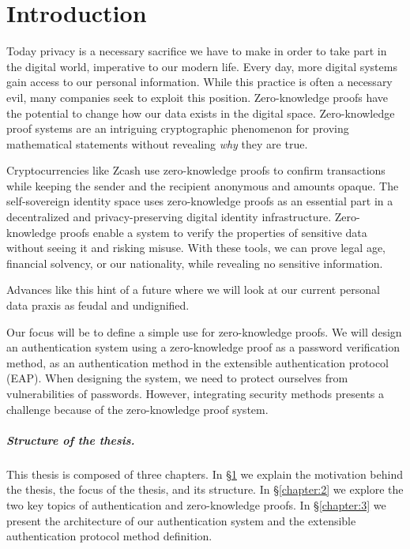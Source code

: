\chapter{Introduction}
\label{chapter:1}

\noindent
Today privacy is a necessary sacrifice we have to make in order to take part in the digital world, imperative to our modern life.
Every day, more digital systems gain access to our personal information. While this practice is often a necessary evil, many companies seek to exploit this position.
Zero-knowledge proofs have the potential to change how our data exists in the digital space. 
Zero-knowledge proof systems are an intriguing cryptographic phenomenon for proving mathematical statements without revealing \textit{why} they are true.

Cryptocurrencies like Zcash \cite{hopwood2016zcash} use zero-knowledge proofs to confirm transactions while keeping the sender and the recipient anonymous and amounts opaque.
The self-sovereign identity space \cite{tobin2016inevitable} uses zero-knowledge proofs as an essential part in a decentralized and privacy-preserving digital identity infrastructure.
Zero-knowledge proofs enable a system to verify the properties \cite{10.1007/978-3-540-89255-7_15} of sensitive data without seeing it and risking misuse. With these tools, we can prove legal age, financial solvency, or our nationality, while revealing no sensitive information.

Advances like this hint of a future where we will look at our current personal data praxis as feudal and undignified.

\bigskip
\noindent
Our focus will be to define a simple use for zero-knowledge proofs.
We will design an authentication system using a zero-knowledge proof as a password verification method, as an authentication method in the extensible authentication protocol (EAP).
When designing the system, we need to protect ourselves from vulnerabilities of passwords.
However, integrating security methods presents a challenge because of the zero-knowledge proof system.

\paragraph{Structure of the thesis.}
This thesis is composed of three chapters.
In \S\ref{chapter:1} we explain the motivation behind the thesis, the focus of the thesis, and its structure.
In \S\ref{chapter:2} we explore the two key topics of authentication and zero-knowledge proofs.
In \S\ref{chapter:3} we present the architecture of our authentication system and the extensible authentication protocol method definition.


